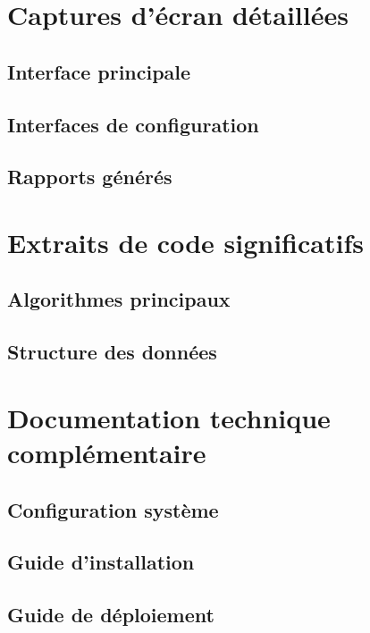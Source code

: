 \begin{appendices}

    \chapter{Captures d'écran détaillées}

    \section{Interface principale}

    \section{Interfaces de configuration}

    \section{Rapports générés}

    \chapter{Extraits de code significatifs}

    \section{Algorithmes principaux}

    \section{Structure des données}

    \chapter{Documentation technique complémentaire}

    \section{Configuration système}

    \section{Guide d'installation}

    \section{Guide de déploiement}


\end{appendices}
